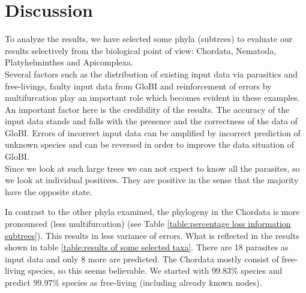 \chapter{Discussion}

To analyze the results, we have selected some phyla (subtrees) to evaluate our results 
selectively from the biological point of view: Chordata, Nematoda, Platyhelminthes and 
Apicomplexa. \\

Several factors such as the distribution of existing input data via parasitics and free-livings, 
faulty input data from GloBI and reinforcement of errors by multifurcation play an important role which becomes evident in these examples. \\

An important factor here is the credibility of the results. The accuracy of the input data 
stands and falls with the presence and the correctness of the data of GloBI. Errors of incorrect 
input data can be amplified by incorrect prediction of unknown species and can be reversed in 
order to improve the data situation of GloBI. \\
Since we look at such large trees we can not expect to know all the parasites, so we look at 
individual positives. They are positive in the sense that the majority have the opposite state.

In contrast to the other phyla examined, the phylogeny in the Chordata is more pronounced (less 
        multifurcation) (see Table \ref{table:percentage loss information subtrees}). This results in 
        less variance of errors. What is reflected in the results shown in table 
        \ref{table:results of some selected taxa}. There are 18 parasites as input data and only 8 more are 
        predicted. The Chordata mostly consist of free-living species, so this seems believable. We 
        started with 99.83\%  species and predict 99.97\% species as free-living (including already 
        known nodes).

